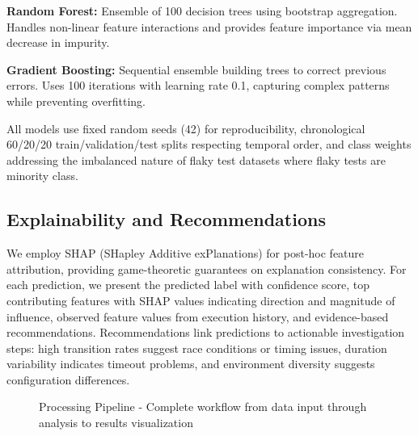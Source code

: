 \documentclass[conference]{IEEEtran}
\begin{document}
\textbf{Random Forest:} Ensemble of 100 decision trees using bootstrap aggregation. Handles non-linear feature interactions and provides feature importance via mean decrease in impurity.

\textbf{Gradient Boosting:} Sequential ensemble building trees to correct previous errors. Uses 100 iterations with learning rate 0.1, capturing complex patterns while preventing overfitting.

All models use fixed random seeds (42) for reproducibility, chronological 60/20/20 train/validation/test splits respecting temporal order, and class weights addressing the imbalanced nature of flaky test datasets where flaky tests are minority class.

\subsection{Explainability and Recommendations}
We employ SHAP (SHapley Additive exPlanations) \cite{lundberg2017unified} for post-hoc feature attribution, providing game-theoretic guarantees on explanation consistency. For each prediction, we present the predicted label with confidence score, top contributing features with SHAP values indicating direction and magnitude of influence, observed feature values from execution history, and evidence-based recommendations. Recommendations link predictions to actionable investigation steps: high transition rates suggest race conditions or timing issues, duration variability indicates timeout problems, and environment diversity suggests configuration differences.

\begin{figure}[htbp]
\centering
{}
\caption{Processing Pipeline - Complete workflow from data input through analysis to results visualization}
\label{fig:flowchart}
\end{figure}
\end{document}
